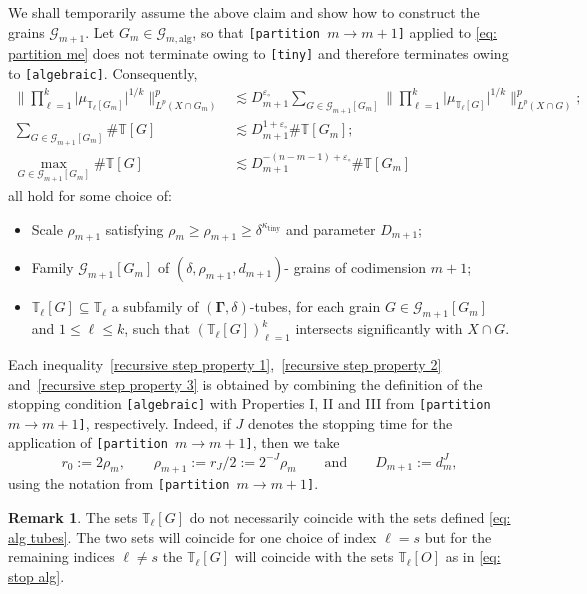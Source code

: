 \documentclass[reqno]{amsart}
\numberwithin{equation}{section}
\newcommand{\T}{\mathbb{T}}
\newcommand{\cG}{\mathcal{G}}
\newcommand{\bdGamma}{\boldsymbol{\Gamma}}
\theoremstyle{plain}
\theoremstyle{definition}
\newtheorem{remark}[theorem]{Remark}
\newcommand{\ttiny}{\mathrm{tiny}}
\newcommand{\alg}{\mathrm{alg}}
\begin{document}
We shall temporarily assume the above claim and show how to construct the grains $\cG_{m+1}$. Let $G_m \in \cG_{m,\alg}$, so that \texttt{[partition $m \to m+1$]} applied to \eqref{eq: partition me} does not terminate owing to \texttt{[tiny]} and therefore terminates owing to \texttt{[algebraic]}. Consequently, 
  \begin{align}\label{recursive step property 1}
      \Big\|\prod_{\ell=1}^k \big|\mu_{\T_{\ell}[G_m]} \big|^{1/k}\Big\|_{L^p(X \cap G_m)}^p &\lesssim  D_{m+1}^{\varepsilon_{\circ}} \sum_{G \in \cG_{m+1}[G_m]} \Big\|\prod_{\ell=1}^k \big|\mu_{\T_{\ell}[G]} \big|^{1/k}\Big\|_{L^p(X \cap G)}^p; \\
\label{recursive step property 2}
    \sum_{G \in \cG_{m+1}[G_m]}  \#\T[G] &\lesssim D_{m+1}^{1 + \varepsilon_{\circ}} \#\T[G_m]; \\
\label{recursive step property 3}
\max_{G \in \cG_{m+1}[G_m]} \#\T[G] & \lesssim   D_{m+1}^{-(n-m-1) + \varepsilon_{\circ}} \#\T[G_m]
\end{align}
all hold for some choice of:
\begin{itemize}
    \item Scale $\rho_{m+1}$ satisfying $\rho_m \geq \rho_{m+1} \geq \delta^{\kappa_{\ttiny}}$ and parameter $D_{m+1}$;
    \item Family $\cG_{m+1}[G_m]$ of $(\delta, \rho_{m+1}, d_{m+1})$-
    grains of codimension $m+1$;
    \item $\T_{\ell}[G] \subseteq \T_{\ell}$ a subfamily of $(\bdGamma, \delta)$-tubes, for each grain $G \in \cG_{m+1}[G_m]$ and $1 \leq \ell \leq k$, such that $(\T_{\ell}[G])_{\ell = 1}^k$ intersects significantly with $X \cap G$.
\end{itemize}
Each inequality~\eqref{recursive step property 1},~\eqref{recursive step property 2} and~\eqref{recursive step property 3} is obtained by combining the definition of the stopping condition \texttt{[algebraic]} with Properties I, II and III from \texttt{[partition $m \to m+1$]}, respectively. Indeed, if $J$ denotes the stopping time for the application of \texttt{[partition $m \to m+1$]}, then we take
\begin{equation*}
    r_0 := 2\rho_m ,\qquad \rho_{m+1} := r_J/2 := 2^{-J}\rho_m\qquad \textrm{and}\qquad D_{m+1} := d_{m}^J,
\end{equation*}
using the notation from \texttt{[partition $m \to m+1$]}.

\begin{remark} The sets $\T_{\ell}[G]$ do not necessarily coincide with the sets defined \eqref{eq: alg tubes}. The two sets will coincide for one choice of index $\ell = s$ but for the remaining indices $\ell \neq s$ the $\T_{\ell}[G]$ will coincide with the sets $\T_{\ell}[O]$ as in \eqref{eq: stop alg}. 
\end{remark}
\end{document}
